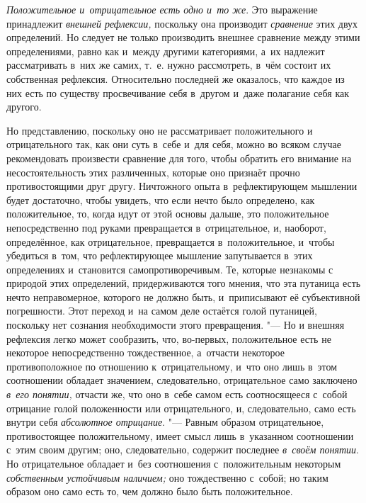 
{\em Положительное и~отрицательное есть одно и~то же}.
Это выражение принадлежит {\em внешней рефлексии,}
поскольку она производит {\em сравнение} этих двух
определений. Но следует не только производить внешнее сравнение между этими
определениями, равно как и~между другими категориями, а~их надлежит
рассматривать в~них же самих, т.~е. нужно рассмотреть, в~чём состоит их
собственная рефлексия. Относительно последней же оказалось, что каждое из
них есть по существу просвечивание себя в~другом и~даже полагание себя как
другого.

Но представлению, поскольку оно не рассматривает положительного и
отрицательного так, как они суть в~себе и~для себя, можно во всяком случае
рекомендовать произвести сравнение для того, чтобы обратить его внимание на
несостоятельность этих различенных, которые оно признаёт прочно
противостоящими друг другу. Ничтожного опыта в~рефлектирующем мышлении
будет достаточно, чтобы увидеть, что если нечто было определено, как
положительное, то, когда идут от этой основы дальше, это положительное
непосредственно под руками превращается в~отрицательное, и, наоборот,
определённое, как отрицательное, превращается в~положительное, и~чтобы
убедиться в~том, что рефлектирующее мышление запутывается в~этих
определениях и~становится самопротиворечивым. Те, которые незнакомы с
природой этих определений, придерживаются того мнения, что эта путаница
есть нечто неправомерное, которого не должно быть, и~приписывают её
субъективной погрешности. Этот переход и~на самом деле остаётся голой
путаницей, поскольку нет сознания необходимости этого превращения. "--- Но и
внешняя рефлексия легко может сообразить, что, во-первых, положительное
есть не некоторое непосредственно тождественное, а~отчасти некоторое
противоположное по отношению к~отрицательному, и~что оно лишь в~этом
соотношении обладает значением, следовательно, отрицательное само заключено
{\em в~его понятии,} отчасти
же, что оно в~себе самом есть соотносящееся с~собой отрицание голой
положенности или отрицательного, и, следовательно, само есть внутри себя
{\em абсолютное отрицание}. "--- Равным образом
отрицательное, противостоящее положительному, имеет смысл лишь в~указанном
соотношении с~этим своим другим; оно, следовательно, содержит последнее
{\em в~своём понятии}. Но отрицательное обладает и~без
соотношения с~положительным некоторым {\em собственным
устойчивым наличием;} оно тождественно с~собой; но таким образом оно само
есть то, чем должно было быть положительное.

